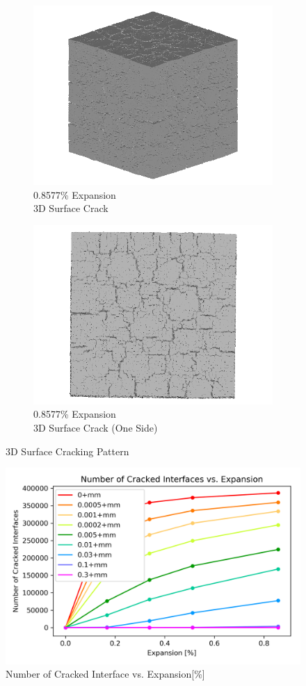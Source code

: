 \begin{figure}[ht!]
    \begin{subfigure}{.5\textwidth}
      \centering
      \includegraphics[width=0.5\linewidth]{Files/exp_3D/DEF/A30X-5C_4_3d.png}
      \caption{0.8577\% Expansion\\3D Surface Crack}
    \end{subfigure}%
    \begin{subfigure}{.5\textwidth}
      \centering
      \includegraphics[width=0.5\linewidth]{Files/exp_3D/DEF/A30X-5C_4_3ds.png}
      \caption{0.8577\% Expansion\\3D Surface Crack (One Side)}
    \end{subfigure}%

\caption{3D Surface Cracking Pattern}
\label{fig:A30_3Dcrack}
\end{figure}

\begin{figure}[ht!]
\centering
\includegraphics[width=.8\linewidth]{Files/interface/A30X-5CCRACK.png}
  \caption{Number of Cracked Interface vs. Expansion[\%]}
  \label{A30X-5CCRACK}
\end{figure}
